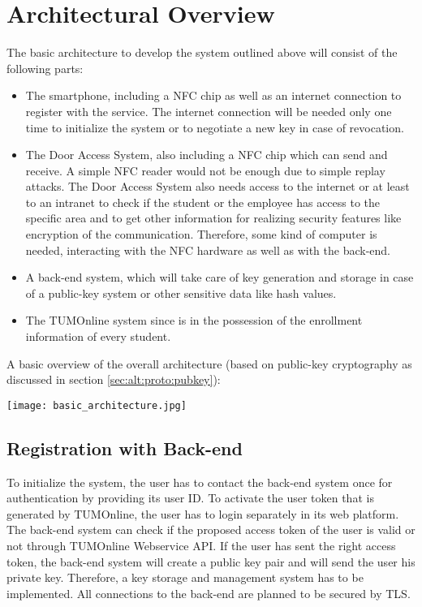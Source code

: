 \section{Architectural Overview}\label{sec:arch}

The basic architecture to develop the system outlined above will consist of the following parts:

\begin{itemize}
\item The smartphone, including a NFC chip as well as an internet connection to register with the service. The internet connection will be needed only one time to initialize the system or to negotiate a new key in case of revocation.
\item The Door Access System, also including a NFC chip which can send and receive. A simple NFC reader would not be enough due to simple replay attacks. The Door Access System also needs access to the internet or at least to an intranet to check if the student or the employee has access to the specific area and to get other information for realizing security features like encryption of the communication. Therefore, some kind of computer is needed, interacting with the NFC hardware as well as with the back-end.
\item A back-end system, which will take care of key generation and storage in case of a public-key system or other sensitive data like hash values.

\item The TUMOnline system since is in the possession of the enrollment information of every student.
\end{itemize} 
%
A basic overview of the overall architecture (based on public-key cryptography as discussed in section \ref{sec:alt:proto:pubkey}): \newline
 \begin{center}
	\texttt{[image: basic\_architecture.jpg]}
\end{center}


\subsection{Registration with Back-end}
To initialize the system, the user has to contact the back-end system once for authentication by providing its user ID.
To activate the user token that is generated by TUMOnline, the user has to login separately in its web platform. 
The back-end system can check if the proposed access token of the user is valid or not through TUMOnline Webservice API.
If the user has sent the right access token, the back-end system will create a public key pair and will send the user his private key. Therefore, a key storage and management system has to be implemented.
All connections to the back-end are planned to be secured by TLS.


